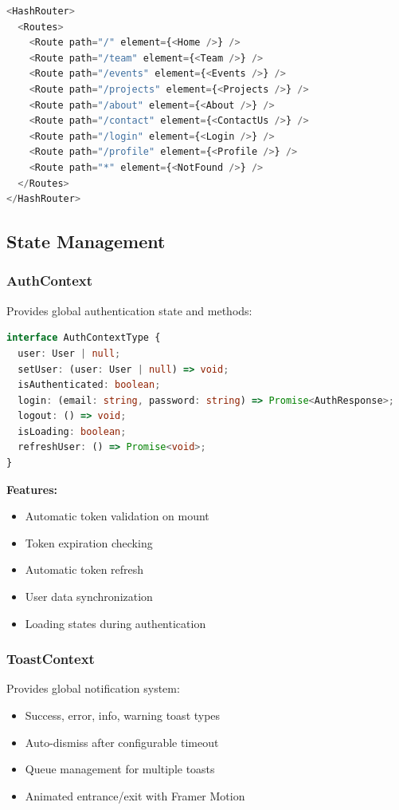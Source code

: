 \documentclass[11pt,a4paper]{article}
\begin{document}
\begin{lstlisting}[language=JavaScript]
<HashRouter>
  <Routes>
    <Route path="/" element={<Home />} />
    <Route path="/team" element={<Team />} />
    <Route path="/events" element={<Events />} />
    <Route path="/projects" element={<Projects />} />
    <Route path="/about" element={<About />} />
    <Route path="/contact" element={<ContactUs />} />
    <Route path="/login" element={<Login />} />
    <Route path="/profile" element={<Profile />} />
    <Route path="*" element={<NotFound />} />
  </Routes>
</HashRouter>
\end{lstlisting}

\subsection{State Management}

\subsubsection{AuthContext}
Provides global authentication state and methods:
\begin{lstlisting}[language=TypeScript]
interface AuthContextType {
  user: User | null;
  setUser: (user: User | null) => void;
  isAuthenticated: boolean;
  login: (email: string, password: string) => Promise<AuthResponse>;
  logout: () => void;
  isLoading: boolean;
  refreshUser: () => Promise<void>;
}
\end{lstlisting}

\textbf{Features:}
\begin{itemize}[leftmargin=*]
    \item Automatic token validation on mount
    \item Token expiration checking
    \item Automatic token refresh
    \item User data synchronization
    \item Loading states during authentication
\end{itemize}

\subsubsection{ToastContext}
Provides global notification system:
\begin{itemize}[leftmargin=*]
    \item Success, error, info, warning toast types
    \item Auto-dismiss after configurable timeout
    \item Queue management for multiple toasts
    \item Animated entrance/exit with Framer Motion
\end{itemize}
\end{document}
